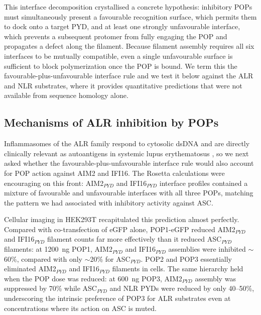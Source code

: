 \documentclass[11pt]{article}
\begin{document}
This interface decomposition crystallised a concrete hypothesis:
inhibitory POPs must simultaneously present a favourable recognition
surface, which permits them to dock onto a target PYD, and at least one
strongly unfavourable interface, which prevents a subsequent protomer
from fully engaging the POP and propagates a defect along the filament.
Because filament assembly requires all six interfaces to be mutually
compatible, even a single unfavourable surface is sufficient to block
polymerization once the POP is bound. We term this the
favourable-plus-unfavourable interface rule and we test it below
against the ALR and NLR substrates, where it provides quantitative
predictions that were not available from sequence homology alone.

\subsection{Mechanisms of ALR inhibition by POPs}

Inflammasomes of the ALR family respond to cytosolic dsDNA
\citep{hornung2009aim2, fernandesalnemri2009aim2, roberts2009hin200,
morrone2015assembly} and are directly clinically relevant as
autoantigens in systemic lupus erythematosus
\citep{antiochos2022dna, kerur2011ifi16}, so we next asked whether the
favourable-plus-unfavourable interface rule would also account for POP
action against AIM2 and IFI16. The Rosetta calculations were
encouraging on this front: AIM2$_{PYD}$ and IFI16$_{PYD}$ interface
profiles contained a mixture of favourable and unfavourable interfaces
with all three POPs, matching the pattern we had associated with
inhibitory activity against ASC.

Cellular imaging in HEK293T recapitulated this prediction almost
perfectly. Compared with co-transfection of eGFP alone, POP1-eGFP
reduced AIM2$_{PYD}$ and IFI16$_{PYD}$ filament counts far more
effectively than it reduced ASC$_{PYD}$ filaments: at 1200~ng POP1,
AIM2$_{PYD}$ and IFI16$_{PYD}$ assemblies were inhibited $\sim$60\%,
compared with only $\sim$20\% for ASC$_{PYD}$. POP2 and POP3 essentially
eliminated AIM2$_{PYD}$ and IFI16$_{PYD}$ filaments in cells. The same
hierarchy held when the POP dose was reduced: at 600~ng POP3,
AIM2$_{PYD}$ assembly was suppressed by 70\% while ASC$_{PYD}$ and
NLR PYDs were reduced by only 40--50\%, underscoring the intrinsic
preference of POP3 for ALR substrates even at concentrations where its
action on ASC is muted.
\end{document}
